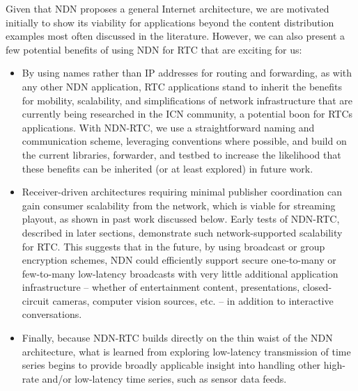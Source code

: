 \documentclass{icn/sig-alternate-2013} %
\newcommand{\ndnrtcName}{NDN-RTC} %
\begin{document}
Given that NDN proposes a general Internet architecture, we are motivated initially to show its viability for applications beyond the content distribution examples most often discussed in the literature.  However, we can also present a few potential benefits of using NDN for RTC that are exciting for us: 
\begin{itemize}
\item By using names rather than IP addresses for routing and forwarding, as with any other NDN application, RTC applications stand to inherit the benefits for mobility, scalability, and simplifications of network infrastructure that are currently being researched in the ICN community, a potential boon for RTCs applications. With \ndnrtcName{}, we use a straightforward naming and communication scheme, leveraging conventions where possible, and build on the current libraries, forwarder, and testbed to increase the likelihood that these benefits can be inherited (or at least explored) in future work. 
\item Receiver-driven architectures requiring minimal publisher coordination can gain consumer scalability from the network, which is viable for streaming playout, as shown in past work discussed below. Early tests of \ndnrtcName{}, described in later sections, demonstrate such network-supported scalability for RTC. This suggests that in the future, by using broadcast or group encryption schemes, NDN could efficiently support secure one-to-many or few-to-many low-latency broadcasts with very little additional application infrastructure -- whether of entertainment content, presentations, closed-circuit cameras, computer vision sources, etc. -- in addition to interactive conversations. 
\item Finally, because \ndnrtcName{} builds directly on the thin waist of the NDN architecture, what is learned from exploring low-latency transmission of time series begins to provide broadly applicable insight into handling other high-rate and/or low-latency time series, such as sensor data feeds.  
\end{itemize}
\end{document}
